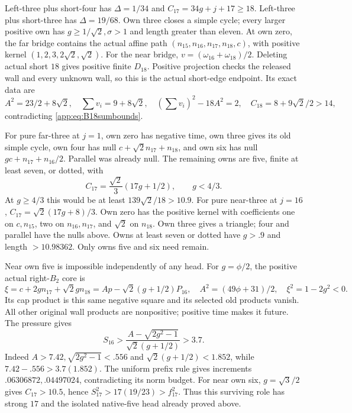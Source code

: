 Left-three plus short-four has
\(\Delta=1/34\) and \(C_{17}=34g+j+17\geq18\).
Left-three plus short-three has \(\Delta=19/68\).
Own three closes a simple cycle; every larger positive own has
\(g\geq1/\sqrt2,\sigma>1\) and length greater than eleven.
At own zero, the far bridge contains the actual affine path
\((n_{15},n_{16},n_{17},n_{18},c)\), with positive kernel
\((1,2,3,2\sqrt2,\sqrt2)\).
For the near bridge, \(v=(\omega_{16}+\omega_{18})/2\).
Deleting actual short \(18\) gives positive finite \(D_{18}\).
Positive projection checks the released wall and every unknown
wall, so this is the actual short-edge endpoint. Its exact data are
\[
 A^2=23/2+8\sqrt2,\quad \sum v_i=9+8\sqrt2,\quad
 (\sum v_i)^2-18A^2=2,\quad
 C_{18}=8+9\sqrt2/2>14,
\]
contradicting \eqref{app:eq:B18sumbounds}.

For pure far-three at \(j=1\), own zero has negative time,
own three gives its old simple cycle, own four has null
\(c+\sqrt2n_{17}+n_{18}\), and own six has null
\(g c+n_{17}+n_{16}/2\). Parallel was already null.
The remaining owns are five, finite at least seven, or dotted, with
\[
 C_{17}=\frac{\sqrt2}{3}(17g+1/2),\qquad g<4/3.
\]
At \(g\geq4/3\) this would be at least
\(139\sqrt2/18>10.9\).
For pure near-three at \(j=16\),
\(C_{17}=\sqrt2(17g+8)/3\).
Own zero has the positive kernel with coefficients one on
\(c,n_{15}\), two on \(n_{16},n_{17}\), and \(\sqrt2\) on \(n_{18}\).
Own three gives a triangle; four and parallel have the nulls above.
Owns at least seven or dotted have \(g>.9\) and length
\(>10.98362\). Only owns five and six need remain.

Near own five is impossible independently of any head.
For \(g=\phi/2\), the positive actual right-\(B_2\) core is
\[
 \xi=c+2gn_{17}+\sqrt2gn_{18}
     =A p-\sqrt2(g+1/2)P_{16},
\quad A^2=(49\phi+31)/2,\quad \xi^2=1-2g^2<0.
\]
Its cap product is this same negative square and its selected
old products vanish. All other original wall products are
nonpositive; positive time makes it future. The pressure gives
\[
 S_{16}>
 \frac{A-\sqrt{2g^2-1}}{\sqrt2(g+1/2)}>3.7.
\]
Indeed \(A>7.42,\sqrt{2g^2-1}<.556\) and
\(\sqrt2(g+1/2)<1.852\), while
\(7.42-.556>3.7(1.852)\).
The uniform prefix rule gives increments
\(.06306872,.04497024\), contradicting its norm budget.
For near own six, \(g=\sqrt3/2\) gives \(C_{17}>10.5\), hence
\(S_{17}^2>17(19/23)>f_{17}^2\).
Thus this surviving role has strong \(17\) and the isolated
native-five head already proved above.

